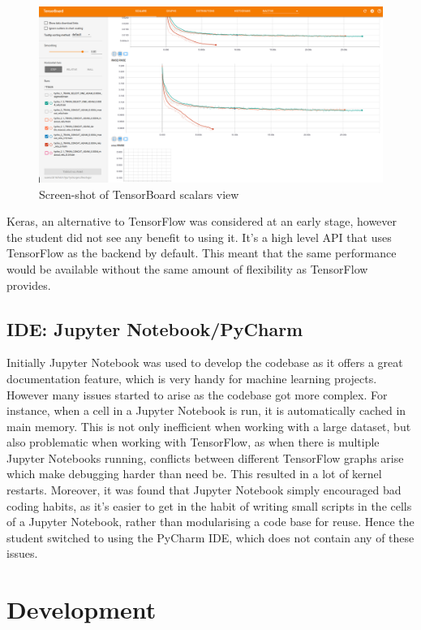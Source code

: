 \documentclass[12pt,a4paper,oneside,oldfontcommands]{memoir}
\begin{document}
\begin{Declaration Of OriginalityOrginality}
    \begin{figure}[ht]
    \center
      \includegraphics[width=\linewidth]{images/tensor_board.png}
      \caption{Screen-shot of TensorBoard scalars view}
      \label{fig:tb_sc}
    \end{figure}

Keras, an alternative to TensorFlow was considered at an early stage, however the student did not see any benefit to using it. It's a high level API that uses TensorFlow as the backend by default. This meant that the same performance would be available without the same amount of flexibility as TensorFlow provides. 
      

\subsection{IDE: Jupyter Notebook/PyCharm}
Initially Jupyter Notebook was used to develop the codebase as it offers a great documentation feature, which is very handy for machine learning projects. However many issues started to arise as the codebase got more complex. For instance, when a cell in a Jupyter Notebook is run, it is automatically cached in main memory. This is not only inefficient when working with a large dataset, but also problematic when working with TensorFlow, as when there is multiple Jupyter Notebooks running, conflicts between different TensorFlow graphs arise which make debugging harder than need be. This resulted in a lot of kernel restarts. Moreover, it was found that Jupyter Notebook simply encouraged bad coding habits, as it's easier to get in the habit of writing small scripts in the cells of a Jupyter Notebook, rather than modularising a code base for reuse. Hence the student switched to using the PyCharm IDE, which does not contain any of these issues. 

\section{Development}


\end{Declaration Of OriginalityOrginality}
\end{document}
